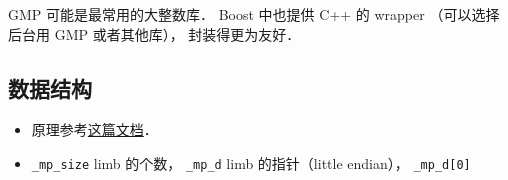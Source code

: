 
GMP 可能是最常用的大整数库． Boost 中也提供 C++ 的 wrapper （可以选择后台用 GMP 或者其他库）， 封装得更为友好．

\subsection{数据结构}
\begin{itemize}
\item 原理参考\href{https://gmplib.org/manual/Integer-Internals#Integer-Internals}{这篇文档}．
\item \verb|_mp_size| limb 的个数， \verb|_mp_d| limb 的指针（little endian）， \verb|_mp_d[0]| 
\end{itemize}


